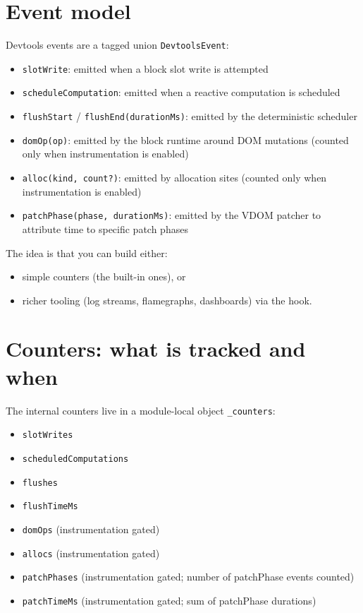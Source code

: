 \section{Event model}

Devtools events are a tagged union \texttt{DevtoolsEvent}:

\begin{itemize}
\item \texttt{slotWrite}: emitted when a block slot write is attempted
\item \texttt{scheduleComputation}: emitted when a reactive computation is scheduled
\item \texttt{flushStart} / \texttt{flushEnd(durationMs)}: emitted by the deterministic scheduler
\item \texttt{domOp(op)}: emitted by the block runtime around DOM mutations (counted only when instrumentation is enabled)
\item \texttt{alloc(kind, count?)}: emitted by allocation sites (counted only when instrumentation is enabled)
\item \texttt{patchPhase(phase, durationMs)}: emitted by the VDOM patcher to attribute time to specific patch phases
\end{itemize}

The idea is that you can build either:

\begin{itemize}
\item simple counters (the built-in ones), or
\item richer tooling (log streams, flamegraphs, dashboards) via the hook.
\end{itemize}

\section{Counters: what is tracked and when}

The internal counters live in a module-local object \texttt{\_counters}:

\begin{itemize}
\item \texttt{slotWrites}
\item \texttt{scheduledComputations}
\item \texttt{flushes}
\item \texttt{flushTimeMs}
\item \texttt{domOps} (instrumentation gated)
\item \texttt{allocs} (instrumentation gated)
\item \texttt{patchPhases} (instrumentation gated; number of patchPhase events counted)
\item \texttt{patchTimeMs} (instrumentation gated; sum of patchPhase durations)
\end{itemize}

